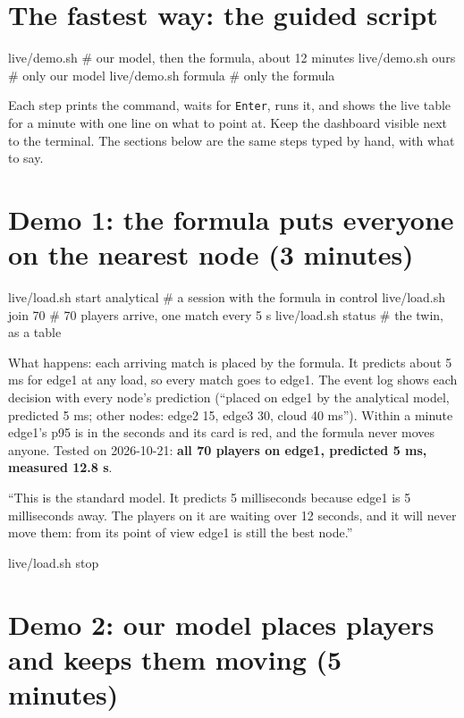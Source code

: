 \documentclass[11pt,a4paper]{article}
\newcommand{\cmd}[1]{\texttt{#1}}
\begin{document}
\section{The fastest way: the guided script}

\begin{term}
live/demo.sh            # our model, then the formula, about 12 minutes
live/demo.sh ours       # only our model
live/demo.sh formula    # only the formula
\end{term}

Each step prints the command, waits for \cmd{Enter}, runs it, and shows the
live table for a minute with one line on what to point at. Keep the
dashboard visible next to the terminal. The sections below are the same
steps typed by hand, with what to say.

\section{Demo 1: the formula puts everyone on the nearest node (3 minutes)}

\begin{term}
live/load.sh start analytical     # a session with the formula in control
live/load.sh join 70              # 70 players arrive, one match every 5 s
live/load.sh status               # the twin, as a table
\end{term}

What happens: each arriving match is placed by the formula. It predicts
about 5 ms for edge1 at any load, so every match goes to edge1. The event log
shows each decision with every node's prediction (``placed on edge1 by the
analytical model, predicted 5 ms; other nodes: edge2 15, edge3 30, cloud
40 ms''). Within a minute edge1's p95 is in the seconds and its card is red,
and the formula never moves anyone. Tested on 2026-10-21: \textbf{all 70
players on edge1, predicted 5 ms, measured 12.8 s}.

\begin{sayit}
``This is the standard model. It predicts 5 milliseconds because edge1 is
5 milliseconds away. The players on it are waiting over 12 seconds, and it
will never move them: from its point of view edge1 is still the best node.''
\end{sayit}

\begin{term}
live/load.sh stop
\end{term}

\section{Demo 2: our model places players and keeps them moving (5 minutes)}
\end{document}
